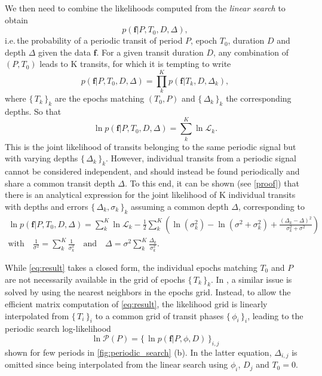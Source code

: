 \documentclass[modern]{aastex631}
\newcommand{\set}[1]{\{\,#1\,\}}
\begin{document}
We then need to combine the likelihoods computed from the \textit{linear search} to obtain
\begin{equation*}
    p(\bm{f} \vert P, T_0 , D, \Delta),
\end{equation*}
i.e.\,the probability of a periodic transit of period $P$, epoch $T_0$, duration $D$ and depth $\Delta$ given the data $\bm{f}$. For a given transit duration $D$, any combination of $(P, T_0)$ leads to K transits, for which it is tempting to write
\begin{equation}\label{eq:attempt}
    p(\bm{f} \vert P, T_0 ,D, \Delta) = \prod_k^K p(\bm{f} \vert T_k, D, \Delta_k),
\end{equation}
where $\set{T_k}_k$ are the epochs matching $(T_0, P)$ and $\set{\Delta_k}_k$ the corresponding depths. So that
\begin{equation*}
    \ln p(\bm{f} \vert P, T_0 ,D, \Delta) = \sum_k^K \ln \mathcal{L}_k.
\end{equation*}
This is the joint likelihood of transits belonging to the same periodic signal but with varying depths  $\set{\Delta_k}_k$. However, individual transits from a periodic signal cannot be considered independent, and should instead be found periodically and share a common transit depth $\Delta$. To this end, it can be shown (see \autoref{proof}) that there is an analytical expression for the joint likelihood of K individual transits with depths and errors $\set{\Delta_k, \sigma_k}_k$ assuming a common depth $\Delta$, corresponding to 
\begin{equation}\label{eq:result}
    \begin{gathered}
        \ln p(\bm{f} \vert P, T_0 ,D, \Delta) =  \sum_{k}^K \ln \mathcal{L}_k  - \frac{1}{2} \sum_k^K\left(\ln(\sigma_{k}^2) - \ln(\sigma^{2} + \sigma_{k}^{2}) +  \frac{\left(\Delta_{k} -
        \Delta\right)^{2}}{\sigma_k^{2} + \sigma^{2}}\right) \\
        \text{with} \quad  \frac{1}{\sigma^2} = \sum_k^K \frac{1}{\sigma_k^2} \quad \text{and} \quad
        \Delta = \sigma^2 \sum_k^K {\frac{\Delta_k}{\sigma_k^2}}.
    \end{gathered}
\end{equation}

While \autoref{eq:result} takes a closed form, the individual epochs matching $T_0$ and $P$ are not necessarily available in the grid of epochs $\set{T_k}_k$. In \cite{foreman2016}, a similar issue is solved by using the nearest neighbors in the epochs grid. Instead, to allow the efficient matrix computation of \autoref{eq:result}, the likelihood grid is linearly interpolated from $\set{T_i}_i$ to a common grid of transit phases $\set{\phi_i}_i$, leading to the periodic search log-likelihood
$$\ln\mathcal{P}(P) = \set{\ln p(\bm{f} \vert P, \phi, D)}_{i,j}$$
shown for few periods in \autoref{fig:periodic_search} (b). In the latter equation, $\Delta_{i,j}$ is omitted since being interpolated from the linear search using $\phi_i$, $D_j$ and $T_0 = 0$.
\end{document}
